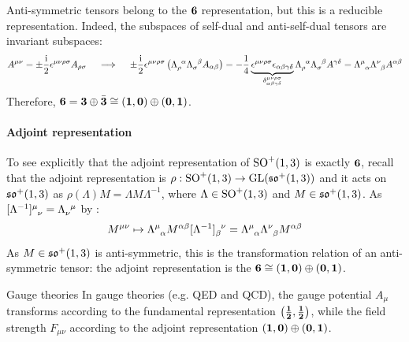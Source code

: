 Anti-symmetric tensors belong to the $ \mathbf{6} $ representation, but this is a reducible representation. Indeed, the subspaces of self-dual and anti-self-dual tensors are invariant subspaces:
\begin{equation*}
  A^{\mu \nu} = \pm \frac{\img}{2} \epsilon^{\mu \nu \rho \sigma} A_{\rho \sigma}
  \quad \implies \quad
  \pm \frac{\img}{2} \epsilon^{\mu \nu \rho \sigma} \left( \tensor{\Lambda}{_\rho^\alpha} \tensor{\Lambda}{_\sigma^\beta} A_{\alpha \beta} \right) = - \frac{1}{4} \underbrace{\epsilon^{\mu \nu \rho \sigma} \epsilon_{\alpha \beta \gamma \delta}}_{\delta^{\mu \nu \rho \sigma}_{\alpha \beta \gamma \delta}} \tensor{\Lambda}{_\rho^\alpha} \tensor{\Lambda}{_\sigma^\beta} A^{\gamma \delta} = \tensor{\Lambda}{^\mu_\alpha} \tensor{\Lambda}{^\nu_\beta} A^{\alpha \beta}
\end{equation*}
Therefore, $ \mathbf{6} = \mathbf{3} \oplus \bar{\mathbf{3}} \cong \mathbf{\left( 1,0 \right)} \oplus \mathbf{\left( 0,1 \right)} $.

\paragraph{Adjoint representation}

To see explicitly that the adjoint representation of $ \mathrm{SO}^+(1,3) $ is exactly $ \mathbf{6} $, recall that the adjoint representation is $ \rho : \mathrm{SO}^+(1,3) \rightarrow \mathrm{GL}(\mathfrak{so}^+(1,3)) $ and it acts on $ \mathfrak{so}^+(1,3) $ as $ \rho(\Lambda) M = \Lambda M \Lambda^{-1} $, where $ \Lambda \in \mathrm{SO}^+(1,3) $ and $ M \in \mathfrak{so}^+(1,3) $. As $ \tensor{[\Lambda^{-1}]}{^\mu_\nu} = \tensor{\Lambda}{_\nu^\mu} $ by :
\begin{equation*}
  M^{\mu \nu} \mapsto \tensor{\Lambda}{^\mu_\alpha} M^{\alpha \beta} \tensor{[\Lambda^{-1}]}{_\beta^\nu} = \tensor{\Lambda}{^\mu_\alpha} \tensor{\Lambda}{^\nu_\beta} M^{\alpha \beta}
\end{equation*}
As $ M \in \mathfrak{so}^+(1,3) $ is anti-symmetric, this is the transformation relation of an anti-symmetric tensor: the adjoint representation is the $ \mathbf{6} \cong \mathbf{\left( 1,0 \right)} \oplus \mathbf{\left( 0,1 \right)} $.

\begin{example}{Gauge theories}{}
  In gauge theories (e.g. QED and QCD), the gauge potential $ A_\mu $ transforms according to the fundamental representation $ \mathbf{\left( \frac{1}{2},\frac{1}{2} \right)} $, while the field strength $ F_{\mu \nu} $ according to the adjoint representation $ \mathbf{\left( 1,0 \right)} \oplus \mathbf{\left( 0,1 \right)} $.
\end{example}


